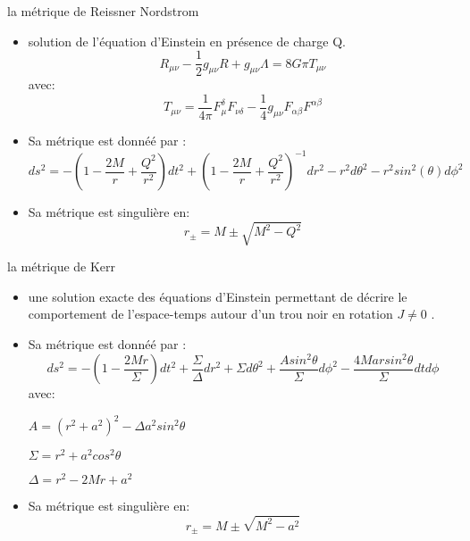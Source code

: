 \documentclass{beamer}
\begin{document}
\begin{frame}
\begin{block}{la métrique de Reissner Nordstrom}
	
	
	\begin{itemize}
		\item  solution de l'équation d'Einstein en présence de charge Q.
		$$R_{\mu\nu}-\dfrac{1}{2}g_{\mu\nu}R+g_{\mu\nu}\Lambda=8G\pi T_{\mu\nu}$$
		avec:
		$$T_{\mu\nu}=\dfrac{1}{4\pi}F_{\mu}^{\delta}F_{\nu\delta}-\dfrac{1}{4}g_{\mu\nu}F_{\alpha\beta}F^{\alpha\beta}$$
		\item Sa métrique est donnéé par :
		$$ds^{2}=-(1-\dfrac{2M}{r}+\dfrac{Q^{2}}{r^{2}})dt^{2}+(1-\dfrac{2M}{r}+\dfrac{Q^{2}}{r^{2}})^{-1}dr^{2}-r^{2}d\theta^{2}-r^{2}sin^{2}(\theta)d\phi^{2}$$ 
		\item  Sa métrique est singulière en:
		$$r_{\pm} = M \pm\sqrt{M^{2}-Q^{2}}$$
		
	\end{itemize}
	
\end{block}
\end{frame}

\begin{frame}
\begin{block}{la métrique de Kerr}
	
	
	\begin{itemize}
		\item  une solution exacte des équations d'Einstein permettant de décrire le comportement de l'espace-temps
		autour d'un trou noir en rotation $J\neq 0$ .
	
		\item Sa métrique est donnéé par :
			$$ds^{2}=-(1-\dfrac{2Mr}{\Sigma})dt^{2}+\dfrac{\Sigma}{\Delta}dr^{2}+\Sigma d\theta^{2}+\dfrac{Asin^{2}\theta}{\Sigma} d\phi^{2}-\dfrac{4Marsin^{2}\theta }{\Sigma} dt d\phi$$
			avec:
			
			$A=(r^{2}+a^{2})^{2}-\Delta a^{2}sin^{2}\theta$
		
			$\Sigma =r^{2}+a^{2}cos^{2}\theta$
			
			$\Delta=r^{2}-2Mr+a^{2}$
		\item  Sa métrique est singulière en:
		$$r_{\pm} = M \pm\sqrt{M^{2}-a^{2}}$$
		
	\end{itemize}
	
\end{block}
\end{frame}
\end{document}

